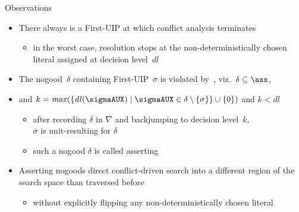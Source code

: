\begin{frame}{Observations}
  \bigskip
  \begin{itemize}
  \item<2->
    There always is a First-UIP at which conflict analysis terminates
    \begin{itemize}\normalsize
    \item
      in the worst case, resolution stops at the
      non-deterministically chosen literal assigned at decision level~$\mathit{dl}$
    \end{itemize}
    \smallskip
  \item<3->
    The nogood~$\delta$ containing First-UIP~$\sigma$ is violated by~\ass,
    viz.\ $\delta\subseteq\ass$,
  \item<3->[] and $k=\mathit{max}(\{\mathit{dl}(\sigmaAUX)\mid\sigmaAUX\in\delta\setminus\{\sigma\}\}\cup\{0\})$ and $k<\mathit{dl}$
    \begin{itemize}\normalsize
    \item
      after recording $\delta$ in $\nabla$ and backjumping to decision level~$k$,\\
      $\overline{\sigma}$ is unit-resulting for $\delta$
    \item
      such a nogood $\delta$ is called \alert{asserting}
    \end{itemize}
    \smallskip
  \item<4-> Asserting nogoods direct conflict-driven search into a different region of the search space than traversed before
    \begin{itemize}\normalsize
    \item without explicitly flipping any non-deterministically chosen literal
    \end{itemize}
  \end{itemize}
\end{frame}
%

